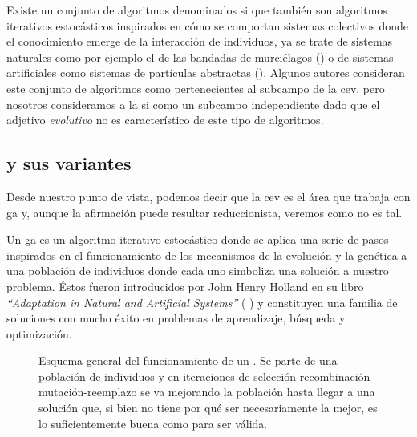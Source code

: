 Existe un conjunto de algoritmos denominados \gls{si} que también son algoritmos iterativos estocásticos inspirados en cómo se comportan sistemas colectivos donde el conocimiento emerge de la interacción de individuos, ya se trate de sistemas naturales como por ejemplo el de las bandadas de murciélagos (\cite{Yang2010}) o de sistemas artificiales como sistemas de partículas abstractas (\cite{Artyukhin2014}). Algunos autores consideran este conjunto de algoritmos como pertenecientes al subcampo de la \gls{cev}, pero nosotros consideramos a la \gls{si} como un subcampo independiente dado que el adjetivo \textit{evolutivo} no es característico de este tipo de algoritmos.

\subsection{ y sus variantes}

Desde nuestro punto de vista, podemos decir que la \gls{cev} es el área que trabaja con \gls{ga} y, aunque la afirmación puede resultar reduccionista, veremos como no es tal.

Un \gls{ga} es un algoritmo iterativo estocástico donde se aplica una serie de pasos inspirados en el funcionamiento de los mecanismos de la evolución y la genética a una población de individuos donde cada uno simboliza una solución a nuestro problema. Éstos fueron introducidos por John Henry Holland en su libro \textit{\enquote{Adaptation in Natural and Artificial Systems}} (\cite{Holland1975} ) y constituyen una familia de soluciones con mucho éxito en problemas de aprendizaje, búsqueda y optimización.

\begin{figure}
	\caption{Esquema general del funcionamiento de un . Se parte de una población de individuos y en iteraciones de selección-recombinación-mutación-reemplazo se va mejorando la población hasta llegar a una solución que, si bien no tiene por qué ser necesariamente la mejor, es lo suficientemente buena como para ser válida.}
	\label{fig:genetic-algorithm-schema}
\end{figure}

